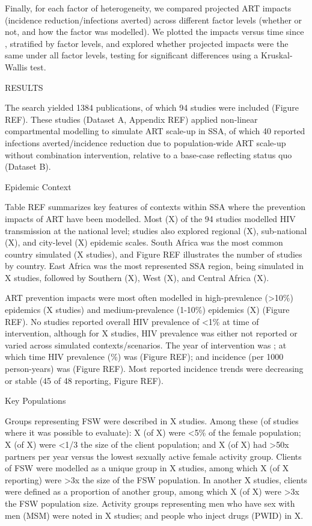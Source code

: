 Finally, for each factor of heterogeneity,
we compared projected ART impacts (incidence reduction/infections averted)
across different factor levels (whether or not, and how the factor was modelled).
We plotted the impacts versus time since , stratified by factor levels,
and explored whether projected impacts were the same under all factor levels,
testing for significant differences using a Kruskal-Wallis test.

RESULTS

The search yielded 1384 publications,
of which 94 studies were included (Figure REF).
These studies (Dataset A, Appendix REF)
applied non-linear compartmental modelling to simulate ART scale-up in SSA,
of which 40 reported infections averted/incidence reduction
due to population-wide ART scale-up without combination intervention,
relative to a base-case reflecting status quo (Dataset B).

Epidemic Context

Table REF summarizes key features of contexts within SSA
where the prevention impacts of ART have been modelled.
Most (X) of the 94 studies modelled HIV transmission at the national level;
studies also explored
regional (X),
sub-national (X), and
city-level (X) epidemic scales.
South Africa was the most common country simulated (X studies), and
Figure REF illustrates the number of studies by country.
East Africa was the most represented SSA region, being simulated in X studies,
followed by Southern (X), West (X), and Central Africa (X).

ART prevention impacts were most often modelled in
high-prevalence ({>10\%}) epidemics (X studies) and
medium-prevalence ({1-10\%}) epidemics (X) (Figure REF).
No studies reported overall HIV prevalence of {<1\%} at time of intervention,
although for X studies, HIV prevalence was either
not reported or varied across simulated contexts/scenarios.
The \xdmdef year of intervention was ; at which time
HIV prevalence (\%) was  (Figure REF); and
incidence (per 1000 person-years) was  (Figure REF).
Most reported incidence trends were decreasing or stable
(45 of 48 reporting, Figure REF). 

Key Populations

Groups representing FSW were described in X studies.
Among these (of studies where it was possible to evaluate):
X (of X) were {<5\%} of the female population;
X (of X) were {<1/3} the size of the client population; and
X (of X) had {>50x} partners per year versus
the lowest sexually active female activity group.
Clients of FSW were modelled as a unique group in X studies,
among which X (of X reporting)
were {>3x} the size of the FSW population.
In another X studies, clients were defined as a proportion of another group,
among which X (of X)
were {>3x} the FSW population size.
Activity groups representing
men who have sex with men (MSM) were noted in X studies; and
people who inject drugs (PWID) in X.

